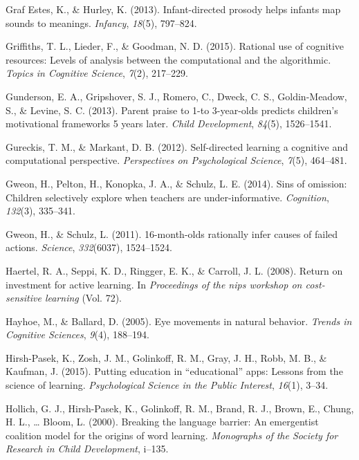 \documentclass[oneside]{report}
\begin{document}
\leavevmode\hypertarget{ref-graf2013infant}{}%
Graf Estes, K., \& Hurley, K. (2013). Infant-directed prosody helps
infants map sounds to meanings. \emph{Infancy}, \emph{18}(5), 797--824.

\leavevmode\hypertarget{ref-griffiths2015rational}{}%
Griffiths, T. L., Lieder, F., \& Goodman, N. D. (2015). Rational use of
cognitive resources: Levels of analysis between the computational and
the algorithmic. \emph{Topics in Cognitive Science}, \emph{7}(2),
217--229.

\leavevmode\hypertarget{ref-gunderson2013parent}{}%
Gunderson, E. A., Gripshover, S. J., Romero, C., Dweck, C. S.,
Goldin-Meadow, S., \& Levine, S. C. (2013). Parent praise to 1-to
3-year-olds predicts children's motivational frameworks 5 years later.
\emph{Child Development}, \emph{84}(5), 1526--1541.

\leavevmode\hypertarget{ref-gureckis2012self}{}%
Gureckis, T. M., \& Markant, D. B. (2012). Self-directed learning a
cognitive and computational perspective. \emph{Perspectives on
Psychological Science}, \emph{7}(5), 464--481.

\leavevmode\hypertarget{ref-gweon2014sins}{}%
Gweon, H., Pelton, H., Konopka, J. A., \& Schulz, L. E. (2014). Sins of
omission: Children selectively explore when teachers are
under-informative. \emph{Cognition}, \emph{132}(3), 335--341.

\leavevmode\hypertarget{ref-gweon201116}{}%
Gweon, H., \& Schulz, L. (2011). 16-month-olds rationally infer causes
of failed actions. \emph{Science}, \emph{332}(6037), 1524--1524.

\leavevmode\hypertarget{ref-haertel2008return}{}%
Haertel, R. A., Seppi, K. D., Ringger, E. K., \& Carroll, J. L. (2008).
Return on investment for active learning. In \emph{Proceedings of the
nips workshop on cost-sensitive learning} (Vol. 72).

\leavevmode\hypertarget{ref-hayhoe2005eye}{}%
Hayhoe, M., \& Ballard, D. (2005). Eye movements in natural behavior.
\emph{Trends in Cognitive Sciences}, \emph{9}(4), 188--194.

\leavevmode\hypertarget{ref-hirsh2015putting}{}%
Hirsh-Pasek, K., Zosh, J. M., Golinkoff, R. M., Gray, J. H., Robb, M.
B., \& Kaufman, J. (2015). Putting education in ``educational'' apps:
Lessons from the science of learning. \emph{Psychological Science in the
Public Interest}, \emph{16}(1), 3--34.

\leavevmode\hypertarget{ref-hollich2000breaking}{}%
Hollich, G. J., Hirsh-Pasek, K., Golinkoff, R. M., Brand, R. J., Brown,
E., Chung, H. L., \ldots{} Bloom, L. (2000). Breaking the language
barrier: An emergentist coalition model for the origins of word
learning. \emph{Monographs of the Society for Research in Child
Development}, i--135.
\end{document}
